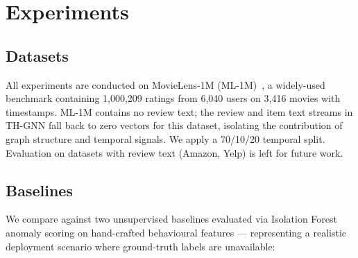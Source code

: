 ﻿%

\section{Experiments}

\subsection{Datasets}
\label{sec:datasets}

All experiments are conducted on MovieLens-1M (ML-1M)~\cite{harper2015movielens}, a widely-used benchmark containing 1,000,209 ratings from 6,040 users on 3,416 movies with timestamps. ML-1M contains no review text; the review and item text streams in TH-GNN fall back to zero vectors for this dataset, isolating the contribution of graph structure and temporal signals. We apply a 70/10/20 temporal split. Evaluation on datasets with review text (Amazon, Yelp) is left for future work.

\subsection{Baselines}
\label{sec:baselines}

We compare against two unsupervised baselines evaluated via Isolation Forest anomaly scoring on hand-crafted behavioural features — representing a realistic deployment scenario where ground-truth labels are unavailable:

